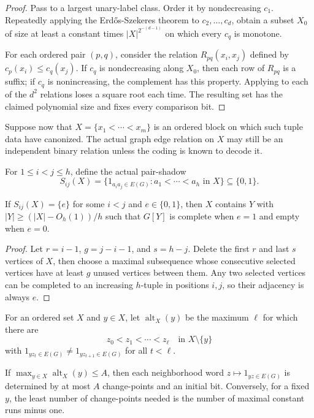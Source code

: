 \begin{proof}
Pass to a largest unary-label class. Order it by nondecreasing $c_1$. Repeatedly applying the Erd\H{o}s-Szekeres theorem \cite{ErdosSzekeres1935} to $c_2,\dots,c_d$, obtain a subset $X_0$ of size at least a constant times $|X|^{2^{-(d-1)}}$ on which every $c_q$ is monotone.

For each ordered pair $(p,q)$, consider the relation $R_{pq}(x_i,x_j)$ defined by $c_p(x_i)\le c_q(x_j)$. If $c_q$ is nondecreasing along $X_0$, then each row of $R_{pq}$ is a suffix; if $c_q$ is nonincreasing, the complement has this property. Applying  to each of the $d^2$ relations loses a square root each time. The resulting set has the claimed polynomial size and fixes every comparison bit.
\end{proof}

Suppose now that $X=\{x_1<\cdots<x_m\}$ is an ordered block on which such tuple data have canonized. The actual graph edge relation on $X$ may still be an independent binary relation unless the coding is known to decode it.

For $1\le i<j\le h$, define the actual pair-shadow
\[
  S_{ij}(X)=\{1_{a_i a_j\in E(G)}:a_1<\cdots<a_h\text{ in }X\}\subseteq\{0,1\}.
\]

\begin{proposition}\label{prop:determinate-pair-shadow}
If $S_{ij}(X)=\{e\}$ for some $i<j$ and $e\in\{0,1\}$, then $X$ contains $Y$ with $|Y|\ge (|X|-O_h(1))/h$ such that $G[Y]$ is complete when $e=1$ and empty when $e=0$.
\end{proposition}

\begin{proof}
Let $r=i-1$, $g=j-i-1$, and $s=h-j$. Delete the first $r$ and last $s$ vertices of $X$, then choose a maximal subsequence whose consecutive selected vertices have at least $g$ unused vertices between them. Any two selected vertices can be completed to an increasing $h$-tuple in positions $i,j$, so their adjacency is always $e$.
\end{proof}

For an ordered set $X$ and $y\in X$, let $\operatorname{alt}_X(y)$ be the maximum $\ell$ for which there are
\[
  z_0<z_1<\cdots<z_\ell\quad\text{in }X\setminus\{y\}
\]
with $1_{yz_t\in E(G)}\ne 1_{yz_{t+1}\in E(G)}$ for all $t<\ell$.

\begin{lemma}\label{lem:bounded-alt}
If $\max_{y\in X}\operatorname{alt}_X(y)\le A$, then each neighborhood word $z\mapsto 1_{yz\in E(G)}$ is determined by at most $A$ change-points and an initial bit. Conversely, for a fixed $y$, the least number of change-points needed is the number of maximal constant runs minus one.
\end{lemma}

